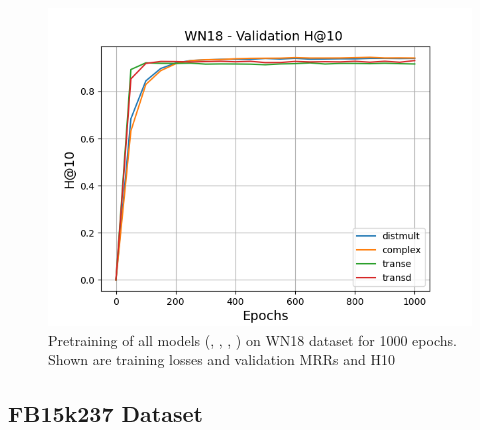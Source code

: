 \begin{figure}
\begin{minipage}{.3\textwidth}
    \end{minipage}
    \begin{minipage}{.3\textwidth}
      \centering
      \includegraphics[width=0.9\linewidth]{figures/results/pretrain/wn18/pretrain_wn18_hit10s.png}
    \end{minipage}%
    \caption{Pretraining of all models (\distmult, \complex, \transe, \transd) on \textsc{WN18} dataset for 1000 epochs. Shown are training losses and validation MRRs and H\@10}
    \label{fig:test}
\end{figure}

\subsection{FB15k237 Dataset}   

